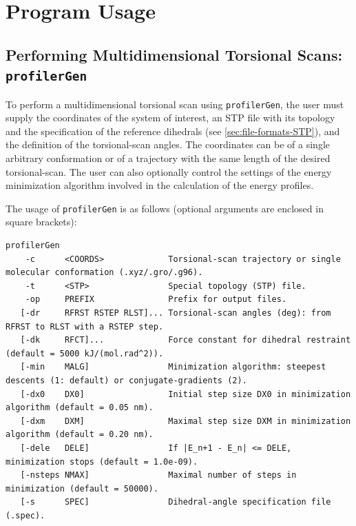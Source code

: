 \documentclass[10pt,a4paper,openany]{memoir}
\numberwithin{equation}{section}
\newcommand{\profilergen}[0]{\texttt{profilerGen}}
\begin{document}
\section{Program Usage}
\label{chap:program-usage}

\subsection{Performing Multidimensional Torsional Scans: \profilergen{}}
\label{sec:program-gen}

To perform a multidimensional torsional scan using \profilergen{}, the
user must supply the coordinates of the system of interest, an STP
file with its topology and the specification of the reference
dihedrals (see \autoref{sec:file-formats-STP}), and the definition of
the torsional-scan angles. The coordinates can be of a single
arbitrary conformation or of a trajectory with the same length of the
desired torsional-scan.  The user can also optionally control the
settings of the energy minimization algorithm involved in the
calculation of the energy profiles.

The usage of \profilergen{} is as follows (optional arguments are enclosed in square brackets):

\begin{lstlisting}
profilerGen
    -c      <COORDS>             Torsional-scan trajectory or single molecular conformation (.xyz/.gro/.g96).
    -t      <STP>                Special topology (STP) file.
    -op     PREFIX               Prefix for output files.
   [-dr     RFRST RSTEP RLST]... Torsional-scan angles (deg): from RFRST to RLST with a RSTEP step.
   [-dk     RFCT]...             Force constant for dihedral restraint (default = 5000 kJ/(mol.rad^2)).
   [-min    MALG]                Minimization algorithm: steepest descents (1: default) or conjugate-gradients (2).
   [-dx0    DX0]                 Initial step size DX0 in minimization algorithm (default = 0.05 nm).
   [-dxm    DXM]                 Maximal step size DXM in minimization algorithm (default = 0.20 nm).
   [-dele   DELE]                If |E_n+1 - E_n| <= DELE, minimization stops (default = 1.0e-09).
   [-nsteps NMAX]                Maximal number of steps in minimization (default = 50000).
   [-s      SPEC]                Dihedral-angle specification file (.spec).
\end{lstlisting}\vspace{2ex} 
\end{document}
